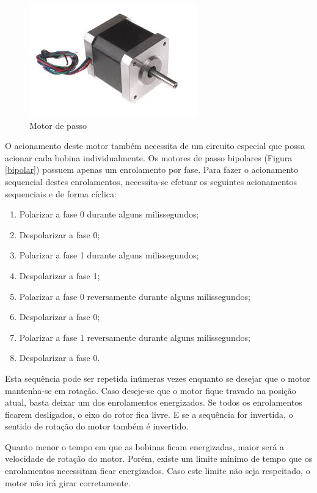 \begin{anexosenv}
\begin{figure}[H]
		\centering
			\includegraphics[scale=1.0]{figuras/motordepasso.png}
		\caption{Motor de passo}
		\label{motordepasso}
\end{figure}

O acionamento deste motor também necessita de um circuito especial que possa acionar cada bobina individualmente. Os motores de passo bipolares (Figura \ref{bipolar}) possuem apenas um enrolamento por fase. Para fazer o acionamento sequencial destes enrolamentos, necessita-se efetuar os seguintes acionamentos sequenciais e de forma cíclica: 
\begin{enumerate}
\item Polarizar a fase 0 durante alguns milissegundos; 
\item Despolarizar a fase 0;
\item Polarizar a fase 1 durante alguns milissegundos;
\item Despolarizar a fase 1;
\item Polarizar a fase 0 reversamente durante alguns milissegundos;
\item Despolarizar a fase 0;
\item Polarizar a fase 1 reversamente durante alguns milissegundos;
\item Despolarizar a fase 0.
\end{enumerate}

Esta sequência pode ser repetida inúmeras vezes enquanto se desejar que o motor mantenha-se em rotação. Caso deseje-se que o motor fique travado na posição atual, basta deixar um dos enrolamentos energizados. Se todos os enrolamentos ficarem desligados, o eixo do rotor fica livre. E se a sequência for invertida, o sentido de rotação do motor também é invertido.

Quanto menor o tempo em que as bobinas ficam energizadas, maior será a velocidade de rotação do motor. Porém, existe um limite mínimo de tempo que os enrolamentos necessitam ficar energizados. Caso este limite não seja respeitado, o motor não irá girar corretamente.


\end{anexosenv}
